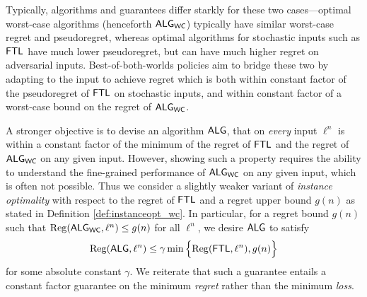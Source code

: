 Typically, algorithms and guarantees differ starkly for these two cases---optimal worst-case algorithms (henceforth $\mathsf{ALG}_{\mathsf{WC}}$) typically have similar worst-case regret and pseudoregret, whereas optimal algorithms for stochastic inputs such as $\mathsf{FTL}$ have much lower pseudoregret, but can have much higher regret on adversarial inputs. 
Best-of-both-worlds policies aim to bridge these two by adapting to the input to achieve regret which is both within constant factor of the pseudoregret of $\mathsf{FTL}$ on stochastic inputs, and within constant factor of a worst-case bound on the regret of $\mathsf{ALG}_{\mathsf{WC}}$.

A stronger objective is to devise an algorithm $\mathsf{ALG}$, that on \emph{every} input $\ell^n$ is within a constant factor of the minimum of the regret of $\mathsf{FTL}$ and the regret of $\mathsf{ALG}_{\mathsf{WC}}$ on any given input.
However, showing such a property requires the ability to understand the fine-grained performance of $\mathsf{ALG}_{\mathsf{WC}}$ on any given input, which is often not possible. Thus we consider a slightly weaker variant of \emph{instance optimality} with respect to the regret of $\mathsf{FTL}$ and a regret upper bound $g(n)$ as stated in Definition \ref{def:instanceopt_wc}. In particular, for a regret bound $g(n)$ such that $\mathrm{Reg}(\mathsf{ALG}_{\mathsf{WC}}, \ell^n) \leq g(n)$ for all $\ell^n$, we desire $\mathsf{ALG}$ to satisfy
\begin{align} 
\label{eq:instoptdef}
    \mathrm{Reg}(\mathsf{ALG},\ell^n)
    \le
    \gamma\min\Big\{\mathrm{Reg}(\mathsf{FTL}, \ell^n), g(n)\Big\}
\end{align}
for some absolute constant $\gamma$. We reiterate that such a guarantee entails a constant factor guarantee on the minimum \emph{regret} rather than the minimum \emph{loss}.
 